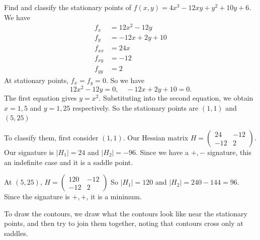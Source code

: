 \documentclass[a4paper]{article}
\begin{document}
\begin{eg}
  Find and classify the stationary points of $f(x, y) = 4x^3 - 12xy + y^2 + 10y + 6$. We have
  \begin{align*}
    f_x &= 12x^2 - 12y\\
    f_y &= -12x + 2y + 10\\
    f_{xx} &= 24x\\
    f_{xy} &= -12\\
    f_{yy} &= 2
  \end{align*}
  At stationary points, $f_x = f_y = 0$. So we have
  \[
  12x^2 - 12y = 0,\quad -12x + 2y + 10 = 0.
  \]
  The first equation gives $y = x^2$. Substituting into the second equation, we obtain $x = 1, 5$ and $y = 1, 25$ respectively. So the stationary points are $(1, 1)$ and $(5, 25)$

  To classify them, first consider $(1, 1)$. Our Hessian matrix $H = 
  \begin{pmatrix}
    24 & -12\\
    -12 & 2
  \end{pmatrix}$. Our signature is $|H_1| = 24$ and $|H_2| = -96$. Since we have a $+, -$ signature, this an indefinite case and it is a saddle point.

  At $(5, 25)$, $H = 
  \begin{pmatrix}
    120 & -12\\
    -12 & 2
  \end{pmatrix}$
  So $|H_1| = 120$ and $|H_2| = 240 - 144 = 96$. Since the signature is $+, +$, it is a minimum.

  To draw the contours, we draw what the contours look like near the stationary points, and then try to join them together, noting that contours cross only at saddles.
\end{eg}
\end{document}
